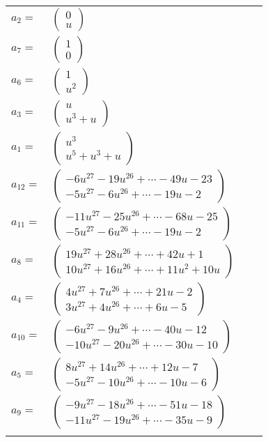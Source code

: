 \documentclass[1p]{elsarticle_modified}
\theoremstyle{definition}
\begin{document}
\begin{tabular}{m{7pt} m{180pt} m{7pt} m{180pt} }
\flushright $a_{2}=$&$\begin{pmatrix}0\\u\end{pmatrix}$ \\
\flushright $a_{7}=$&$\begin{pmatrix}1\\0\end{pmatrix}$ \\
\flushright $a_{6}=$&$\begin{pmatrix}1\\u^2\end{pmatrix}$ \\
\flushright $a_{3}=$&$\begin{pmatrix}u\\u^3+u\end{pmatrix}$ \\
\flushright $a_{1}=$&$\begin{pmatrix}u^3\\u^5+u^3+u\end{pmatrix}$ \\
\flushright $a_{12}=$&$\begin{pmatrix}-6 u^{27}-19 u^{26}+\cdots-49 u-23\\-5 u^{27}-6 u^{26}+\cdots-19 u-2\end{pmatrix}$ \\
\flushright $a_{11}=$&$\begin{pmatrix}-11 u^{27}-25 u^{26}+\cdots-68 u-25\\-5 u^{27}-6 u^{26}+\cdots-19 u-2\end{pmatrix}$ \\
\flushright $a_{8}=$&$\begin{pmatrix}19 u^{27}+28 u^{26}+\cdots+42 u+1\\10 u^{27}+16 u^{26}+\cdots+11 u^2+10 u\end{pmatrix}$ \\
\flushright $a_{4}=$&$\begin{pmatrix}4 u^{27}+7 u^{26}+\cdots+21 u-2\\3 u^{27}+4 u^{26}+\cdots+6 u-5\end{pmatrix}$ \\
\flushright $a_{10}=$&$\begin{pmatrix}-6 u^{27}-9 u^{26}+\cdots-40 u-12\\-10 u^{27}-20 u^{26}+\cdots-30 u-10\end{pmatrix}$ \\
\flushright $a_{5}=$&$\begin{pmatrix}8 u^{27}+14 u^{26}+\cdots+12 u-7\\-5 u^{27}-10 u^{26}+\cdots-10 u-6\end{pmatrix}$ \\
\flushright $a_{9}=$&$\begin{pmatrix}-9 u^{27}-18 u^{26}+\cdots-51 u-18\\-11 u^{27}-19 u^{26}+\cdots-35 u-9\end{pmatrix}$\\&\end{tabular}
\end{document}
